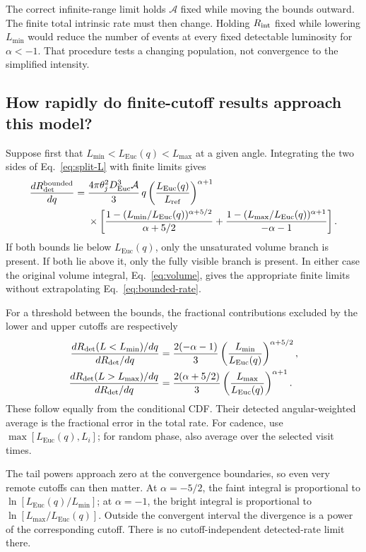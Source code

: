 \documentclass[11pt,a4paper]{article}
\newcommand{\Euc}{\mathrm{Euc}}
\newcommand{\Lref}{L_{\mathrm{ref}}}
\newcommand{\Rdet}{R_{\mathrm{det}}}
\begin{document}
The correct infinite-range limit holds $\mathcal A$ fixed while moving the
bounds outward. The finite total intrinsic rate must then change.
Holding $R_{\rm int}$ fixed while lowering $L_{\min}$ would reduce the
number of events at every fixed detectable luminosity for $\alpha<-1$.
That procedure tests a changing population, not convergence to the
simplified intensity.

\subsection{How rapidly do finite-cutoff results approach this model?}
Suppose first that $L_{\min}<L_\Euc(q)<L_{\max}$ at a given angle.
Integrating the two sides of Eq.~\eqref{eq:split-L} with finite limits gives
\begin{equation}
\begin{aligned}
 \frac{dR_{\rm det}^{\rm bounded}}{dq}={}&
 \frac{4\pi\theta_j^2D_\Euc^3\mathcal A}{3}\,q
 \left(\frac{L_\Euc(q)}{\Lref}\right)^{\alpha+1}\\
 &\times\left[
 \frac{1-(L_{\min}/L_\Euc(q))^{\alpha+5/2}}{\alpha+5/2}
 +\frac{1-(L_{\max}/L_\Euc(q))^{\alpha+1}}{-\alpha-1}\right].
\end{aligned}
\label{eq:bounded-rate}
\end{equation}
If both bounds lie below $L_\Euc(q)$, only the unsaturated volume branch
is present. If both lie above it, only the fully visible branch is present.
In either case the original volume integral, Eq.~\eqref{eq:volume}, gives
the appropriate finite limits without extrapolating Eq.~\eqref{eq:bounded-rate}.

For a threshold between the bounds, the fractional contributions excluded
by the lower and upper cutoffs are respectively
\begin{align}
 \frac{dR_{\rm det}(L<L_{\min})/dq}{d\Rdet/dq}
 &=\frac{2(-\alpha-1)}3
 \left(\frac{L_{\min}}{L_\Euc(q)}\right)^{\alpha+5/2},
 \label{eq:faint-tail}\\
 \frac{dR_{\rm det}(L>L_{\max})/dq}{d\Rdet/dq}
 &=\frac{2(\alpha+5/2)}3
 \left(\frac{L_{\max}}{L_\Euc(q)}\right)^{\alpha+1}.
 \label{eq:bright-tail}
\end{align}
These follow equally from the conditional CDF. Their detected angular-weighted
average is the fractional error in the total rate. For cadence, use
$\max[L_\Euc(q),L_i]$; for random phase, also average over the selected
visit times.

The tail powers approach zero at the convergence boundaries, so even very
remote cutoffs can then matter. At $\alpha=-5/2$, the faint integral is
proportional to $\ln[L_\Euc(q)/L_{\min}]$; at $\alpha=-1$, the bright
integral is proportional to $\ln[L_{\max}/L_\Euc(q)]$.
Outside the convergent interval the divergence is a power of the corresponding
cutoff. There is no cutoff-independent detected-rate limit there.
\end{document}
